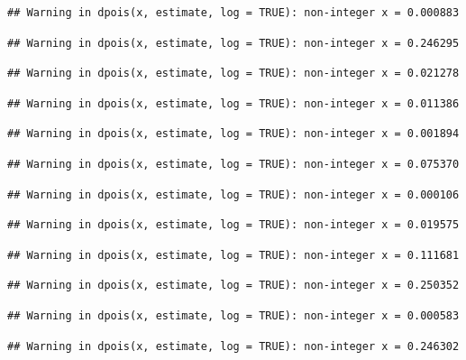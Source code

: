 \documentclass[]{article}
\begin{document}
\begin{verbatim}
## Warning in dpois(x, estimate, log = TRUE): non-integer x = 0.000883
\end{verbatim}

\begin{verbatim}
## Warning in dpois(x, estimate, log = TRUE): non-integer x = 0.246295
\end{verbatim}

\begin{verbatim}
## Warning in dpois(x, estimate, log = TRUE): non-integer x = 0.021278
\end{verbatim}

\begin{verbatim}
## Warning in dpois(x, estimate, log = TRUE): non-integer x = 0.011386
\end{verbatim}

\begin{verbatim}
## Warning in dpois(x, estimate, log = TRUE): non-integer x = 0.001894
\end{verbatim}

\begin{verbatim}
## Warning in dpois(x, estimate, log = TRUE): non-integer x = 0.075370
\end{verbatim}

\begin{verbatim}
## Warning in dpois(x, estimate, log = TRUE): non-integer x = 0.000106
\end{verbatim}

\begin{verbatim}
## Warning in dpois(x, estimate, log = TRUE): non-integer x = 0.019575
\end{verbatim}

\begin{verbatim}
## Warning in dpois(x, estimate, log = TRUE): non-integer x = 0.111681
\end{verbatim}

\begin{verbatim}
## Warning in dpois(x, estimate, log = TRUE): non-integer x = 0.250352
\end{verbatim}

\begin{verbatim}
## Warning in dpois(x, estimate, log = TRUE): non-integer x = 0.000583
\end{verbatim}

\begin{verbatim}
## Warning in dpois(x, estimate, log = TRUE): non-integer x = 0.246302
\end{verbatim}
\end{document}
